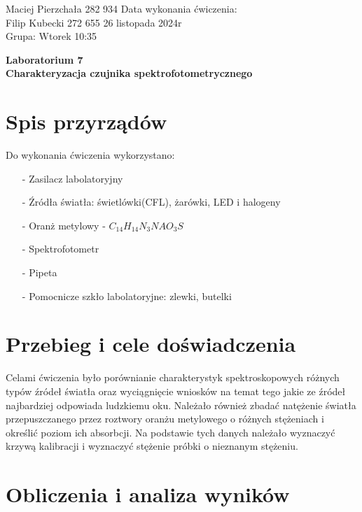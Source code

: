\documentclass[11pt]{article}
\begin{document}
    \begin{flushleft}
        Maciej Pierzchała 282 934 \hfill Data wykonania ćwiczenia:\\
        Filip Kubecki 272 655 \hfill 26 listopada 2024r\\
        Grupa: Wtorek 10:35 \\
    \end{flushleft}
    \begin{center}
        \Large\textbf{Laboratorium 7}\\
        \textbf{Charakteryzacja czujnika spektrofotometrycznego}
    \end{center}
    \hfill
    \vspace{2cm}
    \section{Spis przyrządów}
    \par{
        Do wykonania ćwiczenia wykorzystano:
        \begin{itemize}
            \setlength\itemsep{0em}
            \item[-] Zasilacz labolatoryjny
            \item[-] Źródła światła: świetlówki(CFL), żarówki, LED i halogeny
            \item[-] Oranż metylowy - $C_{14}H_{14}N_{3}NAO_{3}S$
            \item[-] Spektrofotometr
            \item[-] Pipeta
            \item[-] Pomocnicze szkło labolatoryjne: zlewki, butelki
        \end{itemize}
    }
    \section{Przebieg i cele doświadczenia}
    \par\noindent Celami ćwiczenia było porównianie charakterystyk spektroskopowych różnych typów źródeł światła oraz wyciągnięcie
    wniosków na temat tego jakie ze źródeł najbardziej odpowiada ludzkiemu oku. Należało również zbadać natężenie światła przepuszczanego
    przez roztwory oranżu metylowego o różnych stężeniach i określić poziom ich absorbcji. Na podstawie tych danych należało wyznaczyć krzywą
    kalibracji i wyznaczyć stężenie próbki o nieznanym stężeniu.
\newpage
    \section{Obliczenia i analiza wyników}
\end{document}
